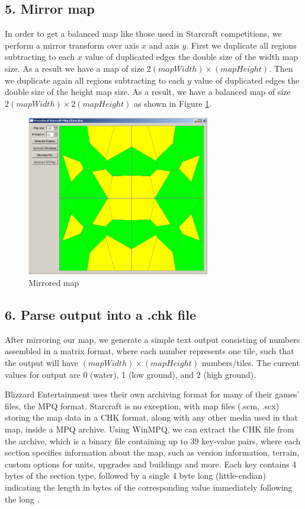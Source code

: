 \documentclass[letterpaper]{article}
\begin{document}
\subsection{5. Mirror map}
In order to get a balanced map like those used in Starcraft competitions, we perform a mirror transform over axis $x$ and axis $y$. First we duplicate all regions subtracting to each $x$ value of duplicated edges the double size of the width map size. As a result we have a map of size $2(mapWidth) \times (mapHeight)$. Then we duplicate again all regions subtracting to each $y$ value of duplicated edges the double size of the height map size. As a result, we have a balanced map of size $2(mapWidth)  \times 2(mapHeight)$ as shown in Figure \ref{fig:mirrored-map}.

\begin{figure}[ht]
    \centering
    \includegraphics[width=8cm]{PCG04.png}
    \caption{Mirrored map}
    \label{fig:mirrored-map}
\end{figure}

\subsection{6. Parse output into a .chk file}
After mirroring our map, we generate a simple text output consisting of numbers assembled in a matrix format, where each number represents one tile, such that the output will have $(mapWidth) \times (mapHeight)$ numbers/tiles. The current values for output are 0 (water), 1 (low ground), and 2 (high ground).

Blizzard Entertainment uses their own archiving format for many of their games' files, the MPQ format. Starcraft is no exception, with map files (.scm, .scx) storing the map data in a CHK format, along with any other media used in that map, inside a MPQ archive. Using WinMPQ, we can extract the CHK file from the archive, which is a binary file containing up to 39 key-value pairs, where each section specifies information about the map, such as version information, terrain, custom options for units, upgrades and buildings and more. Each key contains 4 bytes of the section type, followed by a single 4 byte long (little-endian) indicating the length in bytes of the corresponding value immediately following the long \cite{Olbrantz}.
\end{document}
